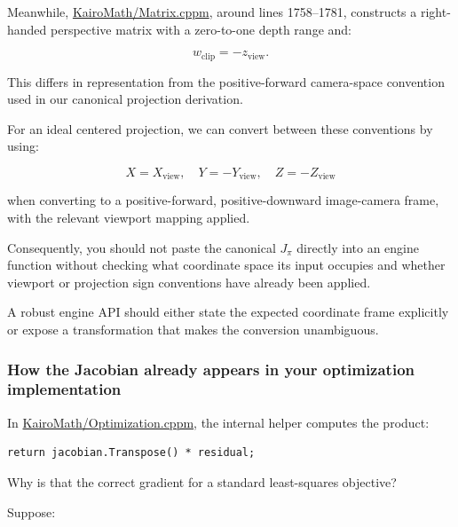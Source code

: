 Meanwhile, \href{https://github.com/swayam8624/KairoMath/blob/master/Matrix.cppm?utm_source=chatgpt.com}{KairoMath/Matrix.cppm}, around lines 1758--1781, constructs a right-handed perspective matrix with a zero-to-one depth range and:

\[
w_{\text{clip}}=-z_{\text{view}}.
\]

This differs in representation from the positive-forward camera-space convention used in our canonical projection derivation.

For an ideal centered projection, we can convert between these conventions by using:

\[
X=X_{\text{view}},\quad Y=-Y_{\text{view}},\quad Z=-Z_{\text{view}}
\]

when converting to a positive-forward, positive-downward image-camera frame, with the relevant viewport mapping applied.

Consequently, you should not paste the canonical \(J_\pi\) directly into an engine function without checking what coordinate space its input occupies and whether viewport or projection sign conventions have already been applied.

A robust engine API should either state the expected coordinate frame explicitly or expose a transformation that makes the conversion unambiguous.

\subsubsection{How the Jacobian already appears in your optimization implementation}\label{02-foundations-ii-ch021-how-the-jacobian-already-appears-in-your-optimization-implementation}

\hypertarget{02-foundations-ii-ch021-how-the-jacobian-already-appears-in-your-optimization-implementation}{}

In \href{https://github.com/swayam8624/KairoMath/blob/master/Optimization.cppm?utm_source=chatgpt.com}{KairoMath/Optimization.cppm}, the internal helper  computes the product:

\begin{verbatim}
return jacobian.Transpose() * residual;
\end{verbatim}

Why is that the correct gradient for a standard least-squares objective?

Suppose:

